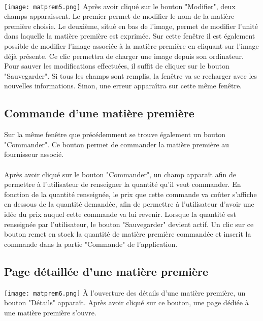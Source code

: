 \paragraph{}
\texttt{[image: matprem5.png]}
Après avoir cliqué sur le bouton "Modifier", deux champs apparaissent. Le 
premier permet de modifier le nom de la matière première choisie. Le deuxième, 
situé en bas de l'image, permet de modifier l'unité dans laquelle la matière 
première est exprimée. Sur cette fenêtre il est également possible de modifier 
l'image associée à la matière première en cliquant sur l'image déjà présente. 
Ce clic permettra de charger une image depuis son ordinateur. Pour sauver les 
modifications effectuées, il suffit de cliquer sur le bouton "Sauvegarder". Si 
tous les champs sont remplis, la fenêtre va se recharger avec les nouvelles 
informations. Sinon, une erreur apparaîtra sur cette même fenêtre.

\subsection{Commande d'une matière première}
Sur la même fenêtre que précédemment se trouve également un bouton "Commander". 
Ce bouton permet de commander la matière première au fournisseur associé.

\paragraph{}
Après avoir cliqué sur le bouton "Commander", un champ apparaît afin de 
permettre à l'utilisateur de renseigner la quantité qu'il veut commander. 
En fonction de la quantité renseignée, le prix que cette commande va coûter 
s'affiche en dessous de la quantité demandée, afin de permettre à l'utilisateur 
d'avoir une idée du prix auquel cette commande va lui revenir. Lorsque la 
quantité est renseignée par l'utilisateur, le bouton "Sauvegarder" devient 
actif. Un clic sur ce bouton remet en stock la quantité de matière première 
commandée et inscrit la commande dans la partie "Commande" de l'application.

\subsection{Page détaillée d'une matière première}
\texttt{[image: matprem6.png]}
À l'ouverture des détails d'une matière première, un bouton "Détails" apparaît. 
Après avoir cliqué sur ce bouton, une page dédiée à une matière première 
s'ouvre. 


